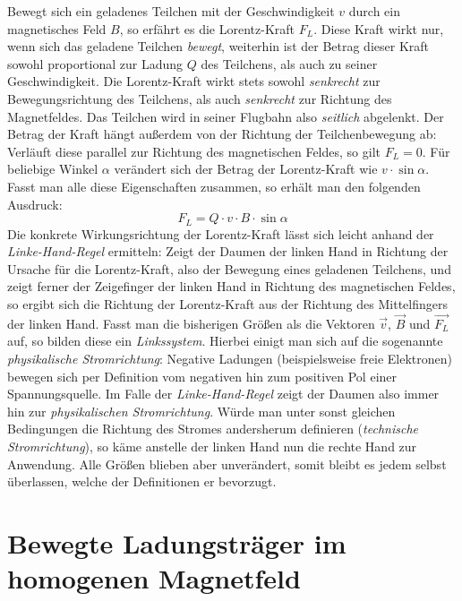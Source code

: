 Bewegt sich ein geladenes Teilchen mit der Geschwindigkeit \(v\) durch ein magnetisches Feld \(B\),
so erf\"ahrt es die Lorentz-Kraft \(F_L\). Diese Kraft wirkt nur, wenn sich das geladene Teilchen \textit{bewegt}, weiterhin
ist der Betrag dieser Kraft sowohl proportional zur Ladung \(Q\) des Teilchens, als auch zu seiner Geschwindigkeit.
Die Lorentz-Kraft wirkt stets sowohl \textit{senkrecht} zur Bewegungsrichtung des Teilchens, als auch \textit{senkrecht} zur Richtung
des Magnetfeldes. Das Teilchen wird in seiner Flugbahn also
\textit{seitlich} abgelenkt. Der Betrag der Kraft h\"angt au{\ss}erdem von der Richtung der Teilchenbewegung ab: Verl\"auft diese
parallel zur Richtung des magnetischen Feldes, so gilt \(F_L = 0\). F\"ur beliebige Winkel \(\alpha\) ver\"andert
sich der Betrag der Lorentz-Kraft wie \(v \cdot \sin{\alpha}\).
Fasst man alle diese Eigenschaften zusammen, so erh\"alt man den folgenden Ausdruck:
\begin{equation}
  \label{eq:lorentz_abs}
  F_L = Q \cdot v \cdot B \cdot \sin{\alpha}
\end{equation}
Die konkrete Wirkungsrichtung der Lorentz-Kraft l\"asst sich leicht anhand der \textit{Linke-Hand-Regel} ermitteln:
Zeigt der Daumen der linken Hand in Richtung der Ursache f\"ur die Lorentz-Kraft, also der Bewegung eines geladenen Teilchens,
und zeigt ferner der Zeigefinger der linken Hand in Richtung des magnetischen Feldes, so ergibt sich die Richtung der
Lorentz-Kraft aus der Richtung des Mittelfingers der linken Hand. Fasst man die bisherigen Gr\"o{\ss}en als die Vektoren
\(\vec{v}\), \(\vec{B}\) und \(\vec{F_L}\) auf, so bilden diese ein \textit{Linkssystem}.
Hierbei einigt man sich auf die sogenannte \textit{physikalische Stromrichtung}: Negative Ladungen (beispielsweise
freie Elektronen) bewegen sich per Definition vom negativen hin zum positiven Pol einer Spannungsquelle. Im Falle der
\textit{Linke-Hand-Regel} zeigt der Daumen also immer hin zur \textit{physikalischen Stromrichtung}.
W\"urde man unter sonst gleichen Bedingungen die Richtung des Stromes andersherum definieren (\textit{technische Stromrichtung}),
so k\"ame anstelle der linken Hand nun die rechte Hand zur Anwendung. Alle Gr\"o{\ss}en blieben aber unver\"andert, somit bleibt es
jedem selbst \"uberlassen, welche der Definitionen er bevorzugt.

\section{Bewegte Ladungstr\"ager im homogenen Magnetfeld}

